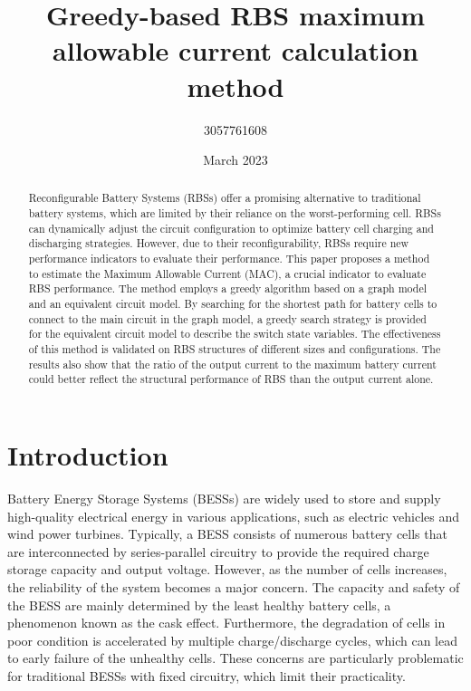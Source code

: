 \documentclass{article}
\title{Greedy-based RBS maximum allowable current calculation method} %
\author{3057761608 }
\date{March 2023}
\begin{document}
\maketitle

\begin{abstract}
    Reconfigurable Battery Systems (RBSs) offer a promising alternative to traditional battery systems, which are limited by their reliance on the worst-performing cell. 
    RBSs can dynamically adjust the circuit configuration to optimize battery cell charging and discharging strategies. 
    However, due to their reconfigurability, RBSs require new performance indicators to evaluate their performance.
    This paper proposes a method to estimate the Maximum Allowable Current (MAC), a crucial indicator to evaluate RBS performance. 
    The method employs a greedy algorithm based on a graph model and an equivalent circuit model. 
    By searching for the shortest path for battery cells to connect to the main circuit in the graph model, a greedy search strategy is provided for the equivalent circuit model to describe the switch state variables.
    The effectiveness of this method is validated on RBS structures of different sizes and configurations.
    The results also show that the ratio of the output current to the maximum battery current could better reflect the structural performance of RBS than the output current alone.
\end{abstract}

\section{Introduction}

Battery Energy Storage Systems (BESSs) are widely used to store and supply high-quality electrical energy in various applications, such as electric vehicles and wind power turbines\cite{desiqueiraControlStrategySmooth2021,karandehTwoStageAlgorithmOptimal2019,yangBatteryEnergyStorage2018,choCommercialResearchBattery2015}.
Typically, a BESS consists of numerous battery cells that are interconnected by series-parallel circuitry to provide the required charge storage capacity and output voltage.
However, as the number of cells increases, the reliability of the system becomes a major concern.
The capacity and safety of the BESS are mainly determined by the least healthy battery cells, a phenomenon known as the cask effect.
Furthermore, the degradation of cells in poor condition is accelerated by multiple charge/discharge cycles, which can lead to early failure of the unhealthy cells\cite{yangUnbalancedDischargingAging2016,fengPropagationMechanismsDiagnosis2019}.
These concerns are particularly problematic for traditional BESSs with fixed circuitry, which limit their practicality.
\end{document}
